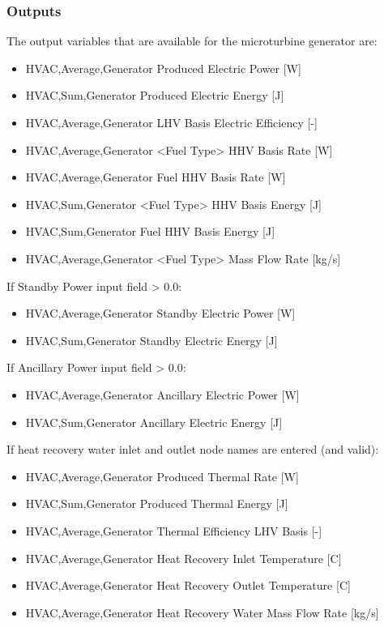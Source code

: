 \subsubsection{Outputs}\label{outputs-7-002}

The output variables that are available for the microturbine generator are:

\begin{itemize}
\item
  HVAC,Average,Generator Produced Electric Power {[}W{]}
\item
  HVAC,Sum,Generator Produced Electric Energy {[}J{]}
\item
  HVAC,Average,Generator LHV Basis Electric Efficiency {[}-{]}
\item
  HVAC,Average,Generator \textless{}Fuel Type\textgreater{} HHV Basis Rate {[}W{]}
\item
  HVAC,Average,Generator Fuel HHV Basis Rate {[}W{]}
\item
  HVAC,Sum,Generator \textless{}Fuel Type\textgreater{} HHV Basis Energy {[}J{]}
\item
  HVAC,Sum,Generator Fuel HHV Basis Energy {[}J{]}
\item
  HVAC,Average,Generator \textless{}Fuel Type\textgreater{} Mass Flow Rate {[}kg/s{]}
\end{itemize}

If Standby Power input field \textgreater{} 0.0:

\begin{itemize}
\item
  HVAC,Average,Generator Standby Electric Power {[}W{]}
\item
  HVAC,Sum,Generator Standby Electric Energy {[}J{]}
\end{itemize}

If Ancillary Power input field \textgreater{} 0.0:

\begin{itemize}
\item
  HVAC,Average,Generator Ancillary Electric Power {[}W{]}
\item
  HVAC,Sum,Generator Ancillary Electric Energy {[}J{]}
\end{itemize}

If heat recovery water inlet and outlet node names are entered (and valid):

\begin{itemize}
\item
  HVAC,Average,Generator Produced Thermal Rate {[}W{]}
\item
  HVAC,Sum,Generator Produced Thermal Energy {[}J{]}
\item
  HVAC,Average,Generator Thermal Efficiency LHV Basis {[}-{]}
\item
  HVAC,Average,Generator Heat Recovery Inlet Temperature {[}C{]}
\item
  HVAC,Average,Generator Heat Recovery Outlet Temperature {[}C{]}
\item
  HVAC,Average,Generator Heat Recovery Water Mass Flow Rate {[}kg/s{]}
\end{itemize}

